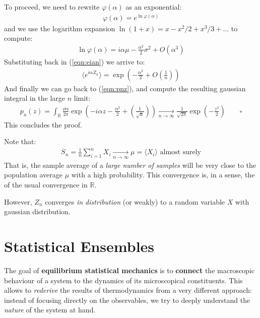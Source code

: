 \documentclass[../../main.tex]{subfiles}
\begin{document}
To proceed, we need to rewrite $\varphi(\alpha)$ as an exponential:
\begin{align*}
    \varphi(\alpha) = e^{\ln \varphi(\alpha)}
\end{align*}
and we use the logarithm expansion $\ln (1+x) = x- x^2/2 + x^3/3 + \dots $ to compute:
\begin{align*}
    \ln \varphi(\alpha) = i \alpha \mu - \frac{\alpha^2}{2} \sigma^2 + O(\alpha^3) 
\end{align*}
Substituting back in (\ref{eqn:eian}) we arrive to:
\begin{align*}
    \langle e^{i \alpha Z_n} \rangle = \exp\left(-\frac{\alpha^2}{2} + O\left(\frac{1}{n} \right) \right)
\end{align*}
And finally we can go back to (\ref{eqn:pnz}), and compute the resulting gaussian integral in the large $n$ limit:
\begin{align*}
    p_n(z) = \int_{\mathbb{R}} \frac{\dd{\alpha}}{2 \pi} \exp\left(-i \alpha z - \frac{\alpha^2}{2} + \operatorname{\left(\frac{1}{\sqrt{n}} \right)}  \right)  \xrightarrow[n \to \infty]{} \frac{1}{\sqrt{2 \pi}} \exp\left(-\frac{z^2}{2}  \right) \qquad \square
\end{align*}
This concludes the proof.

\medskip

Note that:
\begin{align*}
    S_n = \frac{1}{n} \sum_{i=1}^n X_i  \xrightarrow[n \to \infty]{}   \mu = \langle X_i \rangle \text{ almost surely}
\end{align*}
That is, the sample average of a \textit{large number of samples} will be very close to the population average $\mu$ with a high probability. This convergence is, in a sense, the  of the usual convergence in $\mathbb{R}$.

\medskip

However, $Z_n$ converges \textit{in distribution} (or weakly) to a random variable $X$ with gaussian distribution. %



\section{Statistical Ensembles}\label{sec:microcanonical}

The goal of \textbf{equilibrium statistical mechanics} is to \textbf{connect} the macroscopic behaviour of a system to the dynamics of its microscopical constituents. This allows to \textit{rederive} the results of thermodynamics from a very different approach: instead of focusing directly on the observables, we try to deeply understand the \textit{nature} of the system at hand.
\end{document}
